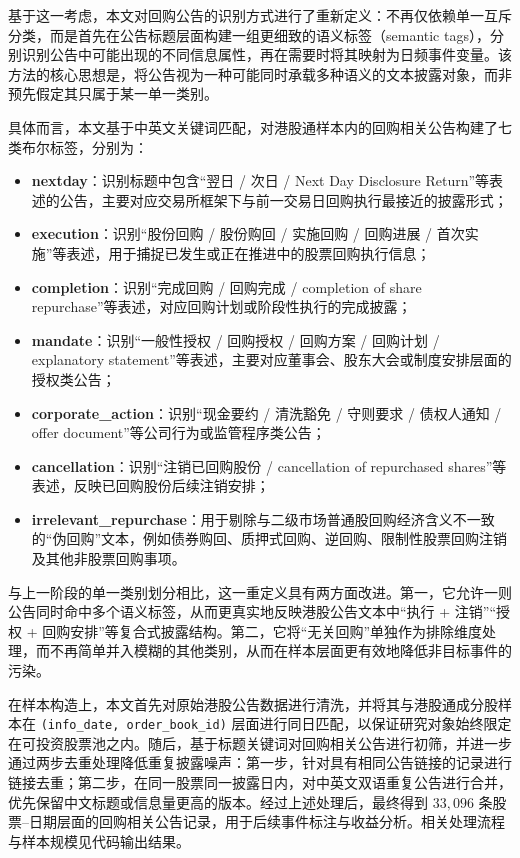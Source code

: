 \documentclass[a4paper,10pt]{article}
\begin{document}
基于这一考虑，本文对回购公告的识别方式进行了重新定义：不再仅依赖单一互斥分类，而是首先在公告标题层面构建一组更细致的语义标签（semantic tags），分别识别公告中可能出现的不同信息属性，再在需要时将其映射为日频事件变量。该方法的核心思想是，将公告视为一种可能同时承载多种语义的文本披露对象，而非预先假定其只属于某一单一类别。

具体而言，本文基于中英文关键词匹配，对港股通样本内的回购相关公告构建了七类布尔标签，分别为：

\begin{itemize}
    \item \textbf{nextday}：识别标题中包含“翌日 / 次日 / Next Day Disclosure Return”等表述的公告，主要对应交易所框架下与前一交易日回购执行最接近的披露形式；
    \item \textbf{execution}：识别“股份回购 / 股份购回 / 实施回购 / 回购进展 / 首次实施”等表述，用于捕捉已发生或正在推进中的股票回购执行信息；
    \item \textbf{completion}：识别“完成回购 / 回购完成 / completion of share repurchase”等表述，对应回购计划或阶段性执行的完成披露；
    \item \textbf{mandate}：识别“一般性授权 / 回购授权 / 回购方案 / 回购计划 / explanatory statement”等表述，主要对应董事会、股东大会或制度安排层面的授权类公告；
    \item \textbf{corporate\_action}：识别“现金要约 / 清洗豁免 / 守则要求 / 债权人通知 / offer document”等公司行为或监管程序类公告；
    \item \textbf{cancellation}：识别“注销已回购股份 / cancellation of repurchased shares”等表述，反映已回购股份后续注销安排；
    \item \textbf{irrelevant\_repurchase}：用于剔除与二级市场普通股回购经济含义不一致的“伪回购”文本，例如债券购回、质押式回购、逆回购、限制性股票回购注销及其他非股票回购事项。
\end{itemize}

与上一阶段的单一类别划分相比，这一重定义具有两方面改进。第一，它允许一则公告同时命中多个语义标签，从而更真实地反映港股公告文本中“执行 + 注销”“授权 + 回购安排”等复合式披露结构。第二，它将“无关回购”单独作为排除维度处理，而不再简单并入模糊的其他类别，从而在样本层面更有效地降低非目标事件的污染。

在样本构造上，本文首先对原始港股公告数据进行清洗，并将其与港股通成分股样本在 \texttt{(info\_date, order\_book\_id)} 层面进行同日匹配，以保证研究对象始终限定在可投资股票池之内。随后，基于标题关键词对回购相关公告进行初筛，并进一步通过两步去重处理降低重复披露噪声：第一步，针对具有相同公告链接的记录进行链接去重；第二步，在同一股票同一披露日内，对中英文双语重复公告进行合并，优先保留中文标题或信息量更高的版本。经过上述处理后，最终得到 \(33{,}096\) 条股票--日期层面的回购相关公告记录，用于后续事件标注与收益分析。相关处理流程与样本规模见代码输出结果。
\end{document}
